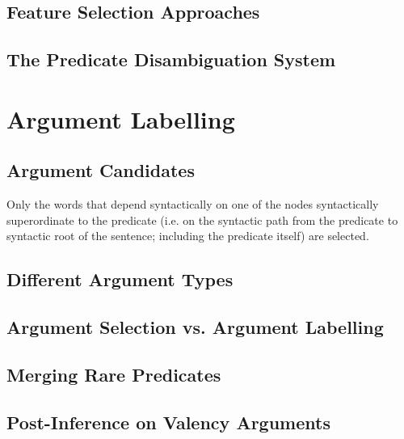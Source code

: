 \documentclass[12pt,notitlepage]{report}
\begin{document}

\section{Feature Selection Approaches}\label{pd-training}



\section{The Predicate Disambiguation System}

\chapter{Argument Labelling}\label{ac}
\section{Argument Candidates}\label{pruning}
\citep{asahara09,zhao09} Only the words that depend syntactically on one of the nodes syntactically superordinate to the predicate (i.e. on the syntactic path from the predicate to syntactic root of the sentence; including the predicate itself) are selected.
\section{Different Argument Types}\label{arg-types}
\section{Argument Selection vs. Argument Labelling}\label{ai-ac}
\section{Merging Rare Predicates}
\section{Post-Inference on Valency Arguments}\label{post-inference}
\end{document}
